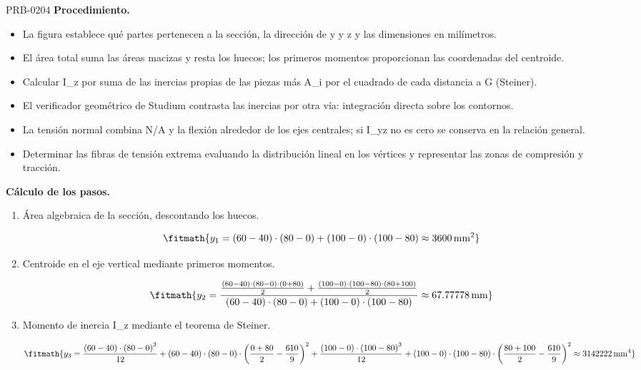 \begin{studiumworked}{PRB-0204}
\textbf{Procedimiento.}\begin{itemize}\item La figura establece qué partes pertenecen a la sección, la dirección de y y z y las dimensiones en milímetros.
\item El área total suma las áreas macizas y resta los huecos; los primeros momentos proporcionan las coordenadas del centroide.
\item Calcular I\_z por suma de las inercias propias de las piezas más A\_i por el cuadrado de cada distancia a G (Steiner).
\item El verificador geométrico de Studium contrasta las inercias por otra vía: integración directa sobre los contornos.
\item La tensión normal combina N/A y la flexión alrededor de los ejes centrales; si I\_yz no es cero se conserva en la relación general.
\item Determinar las fibras de tensión extrema evaluando la distribución lineal en los vértices y representar las zonas de compresión y tracción.\end{itemize}

\textbf{Cálculo de los pasos.}

\begin{enumerate}

\item Área algebraica de la sección, descontando los huecos.

\[\fitmath{y_{1}=\left(60-40\right)\cdot \left(80-0\right)+\left(100-0\right)\cdot \left(100-80\right)\approx 3600\,\mathrm{mm^{2}}}\]

\item Centroide en el eje vertical mediante primeros momentos.

\[\fitmath{y_{2}=\frac{\frac{\left(60-40\right)\cdot \left(80-0\right)\cdot \left(0+80\right)}{2}+\frac{\left(100-0\right)\cdot \left(100-80\right)\cdot \left(80+100\right)}{2}}{\left(60-40\right)\cdot \left(80-0\right)+\left(100-0\right)\cdot \left(100-80\right)}\approx 67.77778\,\mathrm{mm}}\]

\item Momento de inercia I\_z mediante el teorema de Steiner.

\[\fitmath{y_{3}=\frac{\left(60-40\right)\cdot {\left(80-0\right)}^{3}}{12}+\left(60-40\right)\cdot \left(80-0\right)\cdot {\left(\frac{0+80}{2}-\frac{610}{9}\right)}^{2}+\frac{\left(100-0\right)\cdot {\left(100-80\right)}^{3}}{12}+\left(100-0\right)\cdot \left(100-80\right)\cdot {\left(\frac{80+100}{2}-\frac{610}{9}\right)}^{2}\approx 3142222\,\mathrm{mm^{4}}}\]


\end{enumerate}
\end{studiumworked}
